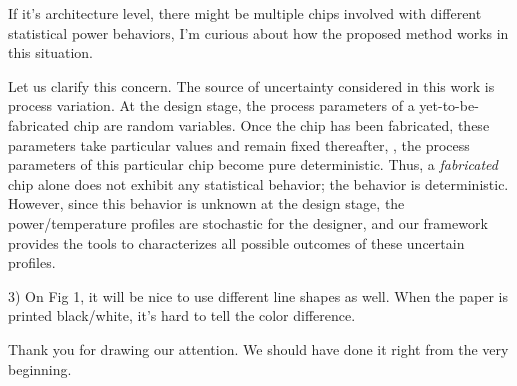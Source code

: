 \begin{reviewer}
If it’s architecture level, there might be multiple chips involved with different statistical power behaviors, I’m curious about how the proposed method works in this situation.
\end{reviewer}
\begin{authors}
Let us clarify this concern.
The source of uncertainty considered in this work is process variation.
At the design stage, the process parameters of a yet-to-be-fabricated chip are random variables.
Once the chip has been fabricated, these parameters take particular values and remain fixed thereafter, \ie, the process parameters of this particular chip become pure deterministic.
Thus, a \emph{fabricated} chip alone does not exhibit any statistical behavior; the behavior is deterministic.
However, since this behavior is unknown at the design stage, the power/temperature profiles are stochastic for the designer, and our framework provides the tools to characterizes all possible outcomes of these uncertain profiles.

\begin{actions}
\end{actions}
\end{authors}

\begin{reviewer}
3) On Fig 1, it will be nice to use different line shapes as well. When the paper is printed black/white, it’s hard to tell the color difference.
\end{reviewer}
\begin{authors}
Thank you for drawing our attention.
We should have done it right from the very beginning.

\begin{actions}
\end{actions}
\end{authors}

